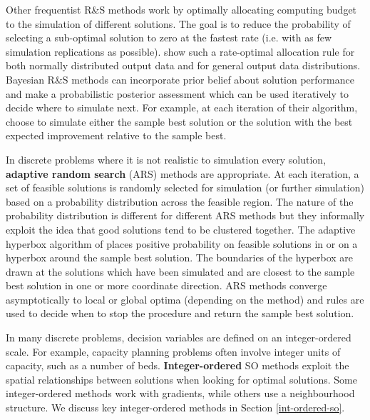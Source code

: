 \documentclass[12pt,a4paper]{article}
\begin{document}
Other frequentist R\&S methods work by optimally allocating computing budget to the simulation of different solutions. The goal is to reduce the probability of selecting a sub-optimal solution to zero at the fastest rate (i.e. with as few simulation replications as possible). \cite{glynn2004large} show such a rate-optimal allocation rule for both normally distributed output data and for general output data distributions. Bayesian R\&S methods can incorporate prior belief about solution performance and make a probabilistic posterior assessment which can be used iteratively to decide where to simulate next. For example, at each iteration of their algorithm, \cite{chen2019complete} choose to simulate either the sample best solution or the solution with the best expected improvement relative to the sample best. 

In discrete problems where it is not realistic to simulation every solution, \textbf{adaptive random search} (ARS) methods are appropriate. At each iteration, a set of feasible solutions is randomly selected for simulation (or further simulation) based on a probability distribution across the feasible region. The nature of the probability distribution is different for different ARS methods but they informally exploit the idea that good solutions tend to be clustered together. The adaptive hyperbox algorithm of \cite{xu2013adaptive} places positive probability on feasible solutions in or on a hyperbox around the sample best solution. The boundaries of the hyperbox are drawn at the solutions which have been simulated and are closest to the sample best solution in one or more coordinate direction. ARS methods converge asymptotically to local or global optima (depending on the method) and rules are used to decide when to stop the procedure and return the sample best solution.

In many discrete problems, decision variables are defined on an integer-ordered scale. For example, capacity planning problems often involve integer units of capacity, such as a number of beds. \textbf{Integer-ordered} SO methods exploit the spatial relationships between solutions when looking for optimal solutions. Some integer-ordered methods work with gradients, while others use a neighbourhood structure. We discuss key integer-ordered methods in Section \ref{int-ordered-so}. 
\end{document}

